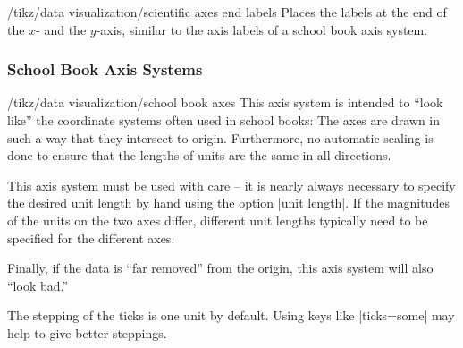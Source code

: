 \begin{key}{/tikz/data visualization/scientific axes end labels}
  Places the labels at the end of the $x$- and the $y$-axis, similar
  to the axis labels of a school book axis system.
\begin{codeexample}[]
\end{codeexample}
\end{key}





\subsubsection{School Book Axis Systems}

\begin{key}{/tikz/data visualization/school book axes}
  This axis system is intended to ``look like'' the coordinate systems
  often used in school books: The axes are drawn in such a way that
  they intersect to origin. Furthermore, no automatic
  scaling is done to ensure that the lengths of units are the same in
  all directions.

  This axis system must be used with care -- it is nearly always
  necessary to specify the desired unit length by hand using the
  option |unit length|. If the magnitudes of the units on the two axes
  differ, different unit lengths typically need to be specified for
  the different axes.

  Finally, if the data is ``far removed'' from the origin, this
  axis system will also ``look bad.''

\begin{codeexample}[]
\end{codeexample}

  The stepping of the ticks is one unit by default. Using keys like
  |ticks=some| may help to give better steppings.
\end{key}


